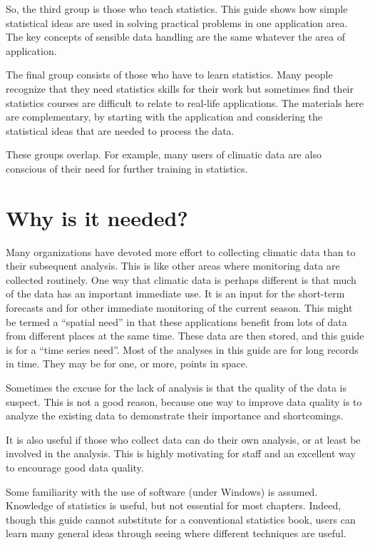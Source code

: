 \documentclass[
  letterpaper,
  DIV=11,
  numbers=noendperiod]{scrreprt}
\begin{document}
So, the third group is those who teach statistics. This guide shows how
simple statistical ideas are used in solving practical problems in one
application area. The key concepts of sensible data handling are the
same whatever the area of application.

The final group consists of those who have to learn statistics. Many
people recognize that they need statistics skills for their work but
sometimes find their statistics courses are difficult to relate to
real-life applications. The materials here are complementary, by
starting with the application and considering the statistical ideas that
are needed to process the data.

These groups overlap. For example, many users of climatic data are also
conscious of their need for further training in statistics.

\section{Why is it needed?}\label{why-is-it-needed}

Many organizations have devoted more effort to collecting climatic data
than to their subsequent analysis. This is like other areas where
monitoring data are collected routinely. One way that climatic data is
perhaps different is that much of the data has an important immediate
use. It is an input for the short-term forecasts and for other immediate
monitoring of the current season. This might be termed a ``spatial
need'' in that these applications benefit from lots of data from
different places at the same time. These data are then stored, and this
guide is for a ``time series need''. Most of the analyses in this guide
are for long records in time. They may be for one, or more, points in
space.

Sometimes the excuse for the lack of analysis is that the quality of the
data is suspect. This is not a good reason, because one way to improve
data quality is to analyze the existing data to demonstrate their
importance and shortcomings.

It is also useful if those who collect data can do their own analysis,
or at least be involved in the analysis. This is highly motivating for
staff and an excellent way to encourage good data quality.

Some familiarity with the use of software (under Windows) is assumed.
Knowledge of statistics is useful, but not essential for most chapters.
Indeed, though this guide cannot substitute for a conventional
statistics book, users can learn many general ideas through seeing where
different techniques are useful.
\end{document}

